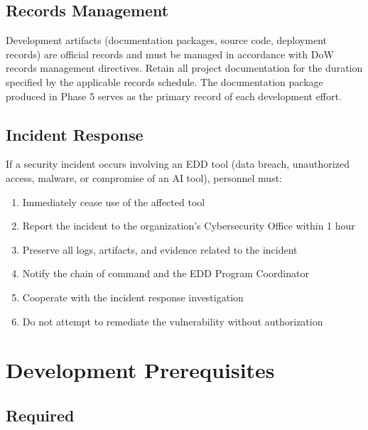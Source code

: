 \documentclass[11pt,letterpaper]{article}
\begin{document}
\subsection{Records Management}
\label{sec:records-management}

Development artifacts (documentation packages, source code, deployment records) are
official records and must be managed in accordance with DoW records management directives.
Retain all project documentation for the duration specified by the applicable records
schedule. The documentation package produced in Phase 5 serves as the primary record
of each development effort.

\subsection{Incident Response}
\label{sec:incident-response}

If a security incident occurs involving an EDD tool (data breach, unauthorized access,
malware, or compromise of an AI tool), personnel must:

\begin{enumerate}
  \item Immediately cease use of the affected tool
  \item Report the incident to the organization's Cybersecurity Office within 1 hour
  \item Preserve all logs, artifacts, and evidence related to the incident
  \item Notify the chain of command and the EDD Program Coordinator
  \item Cooperate with the incident response investigation
  \item Do not attempt to remediate the vulnerability without authorization
\end{enumerate}

\section{Development Prerequisites}
\label{sec:development-prerequisites}

\subsection{Required}
\label{sec:required}
\end{document}
